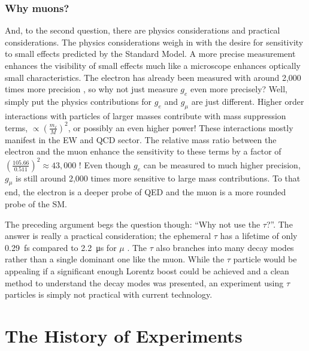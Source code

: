 \subsubsection{Why muons?}
And, to the second question, there are physics considerations and practical considerations.  The physics considerations weigh in with the desire for sensitivity to small effects predicted by the Standard Model.  A more precise measurement enhances the visibility of small effects much like a microscope enhances optically small characteristics.  The electron \gmtwo has already been measured with around 2,000 times more precision \cite{g-e-measurement}, so why not just measure $g_e$ even more precisely?  Well, simply put the physics contributions for $g_e$ and $g_\mu$ are just different.  Higher order interactions with particles of larger masses contribute with mass suppression terms, $\propto (\frac{m_\ell}{M})^2$, or possibly an even higher power!  These interactions mostly manifest in the EW and QCD sector.  The relative mass ratio between the electron and the muon enhance the sensitivity to these terms by a factor of $(\frac{105.66}{0.511})^2 \approx 43,000$ \cite{the-muon-g-2}!  Even though $g_e$ can be measured to much higher precision, $g_\mu$ is still around 2,000 times more sensitive to large mass contributions.  To that end, the electron \gmtwo is a deeper probe of QED and the muon \gmtwo is a more rounded probe of the SM.  

The preceding argument begs the question though: ``Why not use the $\tau$?''.  The answer is really a practical consideration; the ephemeral $\tau$ has a lifetime of only \SI{0.29}{\femto\second} compared to \SI{2.2}{\micro\second} for $\mu$ \cite{codata}.  The $\tau$ also branches into many decay modes rather than a single dominant one like the muon.  While the $\tau$ particle would be appealing if a significant enough Lorentz boost could be achieved and a clean method to understand the decay modes was presented, an experiment using $\tau$ particles is simply not practical with current technology.

\section{The History of Experiments} \label{sec:history-expt}

